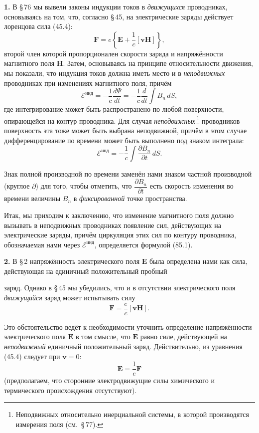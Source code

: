 \documentclass[a4paper,12pt]{article}
\begin{document}

\textbf{1.} В §\,76 мы вывели законы индукции токов в \textit{движущихся}
проводниках, основываясь на том, что, согласно §\,45, на электрические
заряды действует лоренцова сила (45.4):
$$
    \mathbf{F} = e\!\left\{\mathbf{E} + \frac{1}{c}[\mathbf{v}\mathbf{H}]\right\},
$$
второй член которой пропорционален скорости заряда и напряжённости
магнитного поля $\mathbf{H}$. Затем, основываясь на принципе
относительности движения, мы показали, что индукция токов должна иметь
место и в \textit{неподвижных} проводниках при изменениях магнитного
поля, причём
\begin{equation}
    \mathcal{E}^{\text{инд}} = -\frac{1}{c}\frac{d\Psi}{dt}
    = -\frac{1}{c}\frac{d}{dt}\int B_n\,dS,
    \tag{85.1}
\end{equation}
где интегрирование может быть распространено по любой поверхности,
опирающейся на контур проводника. Для случая \textit{неподвижных}\,\footnote{Неподвижных
относительно инерциальной системы, в которой производятся измерения
поля (см.\ §\,77).} проводников поверхность эта тоже может быть выбрана
неподвижной, причём в этом случае дифференцирование по времени может
быть выполнено под знаком интеграла:
$$
    \mathcal{E}^{\text{инд}} = -\frac{1}{c}\int\frac{\partial B_n}{\partial t}\,dS.
$$

Знак полной производной по времени заменён нами знаком частной
производной (круглое $\partial$) для того, чтобы отметить, что
$\dfrac{\partial B_n}{\partial t}$ есть скорость изменения во времени
величины $B_n$ в \textit{фиксированной} точке пространства.

Итак, мы приходим к заключению, что изменение магнитного поля должно
вызывать в неподвижных проводниках появление сил, действующих на
электрические заряды, причём циркуляция этих сил по контуру проводника,
обозначаемая нами через $\mathcal{E}^{\text{инд}}$, определяется
формулой (85.1).

\textbf{2.} В §\,2 напряжённость электрического поля $\mathbf{E}$ была
определена нами как сила, действующая на единичный положительный пробный


заряд. Однако в §\,45 мы убедились, что и в отсутствии электрического
поля \textit{движущийся} заряд может испытывать силу
$$
    \mathbf{F} = \frac{e}{c}[\mathbf{v}\mathbf{H}].
$$

Это обстоятельство ведёт к необходимости уточнить определение
напряжённости электрического поля $\mathbf{E}$ в том смысле, что
$\mathbf{E}$ равно силе, действующей на \textit{неподвижный} единичный
положительный заряд. Действительно, из уравнения (45.4) следует при
$\mathbf{v} = 0$:
$$
    \mathbf{E} = \frac{1}{e}\mathbf{F}
$$
(предполагаем, что сторонние электродвижущие силы химического и
термического происхождения отсутствуют).
\end{document}
